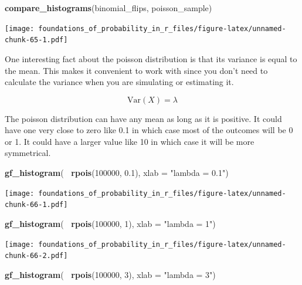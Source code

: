 \documentclass[]{article}
\newenvironment{Shaded}{\begin{snugshade}}{\end{snugshade}}
\newcommand{\DataTypeTok}[1]{\textcolor[rgb]{0.13,0.29,0.53}{#1}}
\newcommand{\DecValTok}[1]{\textcolor[rgb]{0.00,0.00,0.81}{#1}}
\newcommand{\FloatTok}[1]{\textcolor[rgb]{0.00,0.00,0.81}{#1}}
\newcommand{\KeywordTok}[1]{\textcolor[rgb]{0.13,0.29,0.53}{\textbf{#1}}}
\newcommand{\NormalTok}[1]{#1}
\newcommand{\OperatorTok}[1]{\textcolor[rgb]{0.81,0.36,0.00}{\textbf{#1}}}
\newcommand{\StringTok}[1]{\textcolor[rgb]{0.31,0.60,0.02}{#1}}
\begin{document}
\begin{Shaded}
\begin{Highlighting}[]
\KeywordTok{compare_histograms}\NormalTok{(binomial_flips, poisson_sample) }
\end{Highlighting}
\end{Shaded}

\texttt{[image: foundations\_of\_probability\_in\_r\_files/figure-latex/unnamed-chunk-65-1.pdf]}

One interesting fact about the poisson distribution is that its variance
is equal to the mean. This makes it convenient to work with since you
don't need to calculate the variance when you are simulating or
estimating it.

\[\textrm{Var}(X) = \lambda\]

The poisson distribution can have any mean as long as it is positive. It
could have one very close to zero like 0.1 in which case most of the
outcomes will be 0 or 1. It could have a larger value like 10 in which
case it will be more symmetrical.

\begin{Shaded}
\begin{Highlighting}[]
\KeywordTok{gf_histogram}\NormalTok{(}\OperatorTok{~}\StringTok{ }\KeywordTok{rpois}\NormalTok{(}\DecValTok{100000}\NormalTok{, }\FloatTok{0.1}\NormalTok{), }\DataTypeTok{xlab =} \StringTok{"lambda = 0.1"}\NormalTok{)}
\end{Highlighting}
\end{Shaded}

\texttt{[image: foundations\_of\_probability\_in\_r\_files/figure-latex/unnamed-chunk-66-1.pdf]}

\begin{Shaded}
\begin{Highlighting}[]
\KeywordTok{gf_histogram}\NormalTok{(}\OperatorTok{~}\StringTok{ }\KeywordTok{rpois}\NormalTok{(}\DecValTok{100000}\NormalTok{, }\DecValTok{1}\NormalTok{), }\DataTypeTok{xlab =} \StringTok{"lambda = 1"}\NormalTok{)}
\end{Highlighting}
\end{Shaded}

\texttt{[image: foundations\_of\_probability\_in\_r\_files/figure-latex/unnamed-chunk-66-2.pdf]}

\begin{Shaded}
\begin{Highlighting}[]
\KeywordTok{gf_histogram}\NormalTok{(}\OperatorTok{~}\StringTok{ }\KeywordTok{rpois}\NormalTok{(}\DecValTok{100000}\NormalTok{, }\DecValTok{3}\NormalTok{), }\DataTypeTok{xlab =} \StringTok{"lambda = 3"}\NormalTok{)}
\end{Highlighting}
\end{Shaded}
\end{document}
